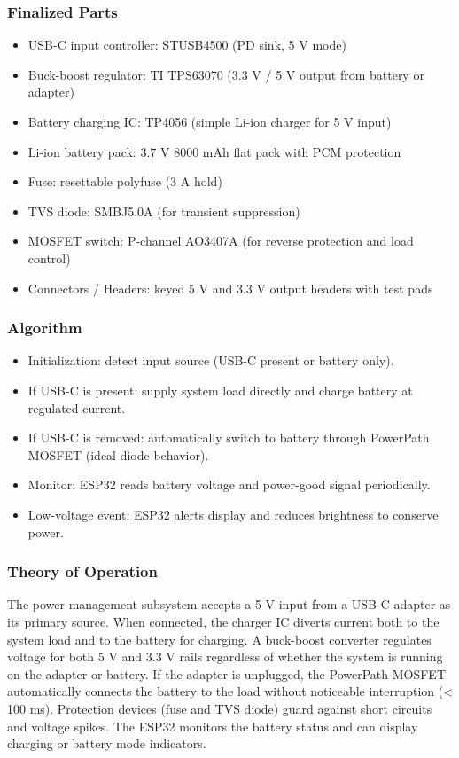 \subsubsection{Finalized Parts}
\begin{itemize}
    \item USB-C input controller: STUSB4500 (PD sink, 5 V mode)
    \item Buck-boost regulator: TI TPS63070 (3.3 V / 5 V output from battery or adapter)
    \item Battery charging IC: TP4056 (simple Li-ion charger for 5 V input)
    \item Li-ion battery pack: 3.7 V 8000 mAh flat pack with PCM protection
    \item Fuse: resettable polyfuse (3 A hold)
    \item TVS diode: SMBJ5.0A (for transient suppression)
    \item MOSFET switch: P-channel AO3407A (for reverse protection and load control)
    \item Connectors / Headers: keyed 5 V and 3.3 V output headers with test pads
\end{itemize}
\subsubsection{Algorithm}
\begin{itemize}
    \item Initialization: detect input source (USB-C present or battery only).
    \item If USB-C is present: supply system load directly and charge battery at regulated current.
    \item If USB-C is removed: automatically switch to battery through PowerPath MOSFET (ideal-diode behavior).
    \item Monitor: ESP32 reads battery voltage and power-good signal periodically.
    \item Low-voltage event: ESP32 alerts display and reduces brightness to conserve power.
\end{itemize}

\subsubsection{Theory of Operation}
The power management subsystem accepts a 5 V input from a USB-C adapter as its primary source. 
When connected, the charger IC diverts current both to the system load and to the battery for charging. 
A buck-boost converter regulates voltage for both 5 V and 3.3 V rails regardless of whether the system is running on the adapter or battery. 
If the adapter is unplugged, the PowerPath MOSFET automatically connects the battery to the load without noticeable interruption (< 100 ms). 
Protection devices (fuse and TVS diode) guard against short circuits and voltage spikes. 
The ESP32 monitors the battery status and can display charging or battery mode indicators.
